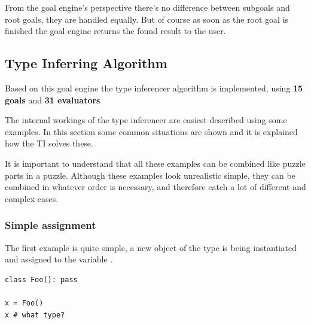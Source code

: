 \documentclass[12pt,halfparskip,DIV11,BCOR10mm]{scrreprt}
\begin{document}
From the goal engine's perspective there's no difference between subgoals and root goals, they are handled equally. But of course as soon as the root goal is finished the goal engine returns the found result to the user.


\subsection{Type Inferring Algorithm}

Based on this goal engine the type inferencer algorithm is implemented, using \textbf{15 goals} and \textbf{31 evaluators}

The internal workings of the type inferencer are easiest described using some examples. In this section some common situations are shown and it is explained how the TI solves these. 

It is important to understand that all these examples can be combined like puzzle parts in a puzzle. Although these examples look unrealistic simple, they can be combined in whatever order is necessary, and therefore catch a lot of different and complex  cases. 

\subsubsection{Simple assignment}

The first example is quite simple, a new object of the type  is being instantiated and assigned to the variable . 

\begin{lstlisting}
class Foo(): pass

x = Foo()
x # what type?
\end{lstlisting}
\end{document}
